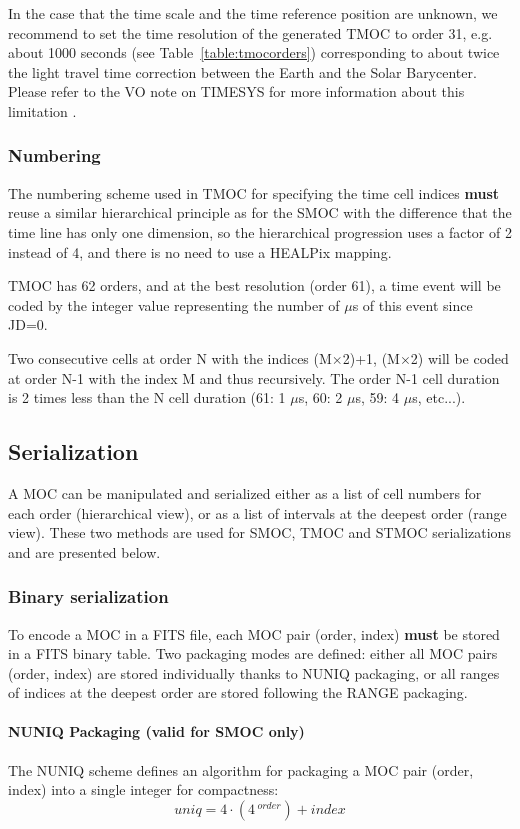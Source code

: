 \documentclass[11pt,a4paper]{ivoa}
\begin{document}
In the case that the time scale and the time reference position are unknown,
we recommend to set the time resolution of the generated TMOC to order
31, e.g. about 1000 seconds (see Table~\ref{table:tmocorders}) corresponding
to about twice the light travel time correction between the Earth and
the Solar Barycenter. Please refer to the VO note on TIMESYS for more
information about this limitation \citep{timesysnote}.


\subsubsection{Numbering}
The numbering scheme used in TMOC for specifying the time cell indices
{\bf must} reuse a similar hierarchical principle as for the SMOC
with the difference that the time line has only one dimension, so the
hierarchical progression uses a factor of 2 instead of 4, and there is
no need to use a HEALPix mapping.

TMOC has 62 orders, and at the best
resolution (order 61), a time event will be coded by the integer value
representing the number of $\mu$s of this event since JD=0.

Two consecutive cells at order N with the indices
  (M$\times$2)+1, (M$\times$2) will be coded at order N-1 with the index
  M and thus recursively. The order N-1 cell duration is 2 times less
  than the N cell duration (61: 1 $\mu$s, 60: 2 $\mu$s, 59: 4 $\mu$s, etc...).

\subsection{Serialization}
A MOC can be manipulated and serialized either as a list of cell
numbers for each order (hierarchical view), or as a list of intervals
at the deepest order (range view). These two methods are used for
SMOC, TMOC and STMOC serializations and are presented below.

\subsubsection{Binary serialization}
To encode a MOC in a FITS file, each MOC pair (order, index) {\bf
  must} be stored in a FITS binary table. Two packaging modes are
defined: either all MOC pairs (order, index) are stored individually
thanks to NUNIQ packaging, or all ranges of indices at the deepest
order are stored following the RANGE packaging.

\paragraph{NUNIQ Packaging (valid for SMOC only)}
The NUNIQ scheme defines an algorithm for packaging a MOC pair (order,
index) into a single integer for compactness:
$$
    \textit{uniq} = 4 \cdot (4\,^\textit{order}) + \textit{index}
$$
\end{document}
